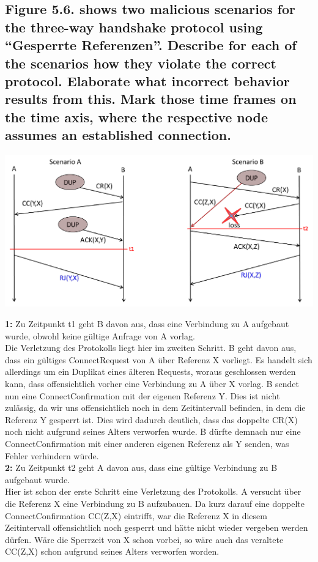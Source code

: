 \documentclass[a4paper,
			llpt,
			solution,
			accentcolor=tud2d,
			colorbacktitle
			]
			{tudexercise}
\begin{document}
\subsection{Figure 5.6. shows two malicious scenarios for the three-way handshake protocol using “Gesperrte Referenzen”. Describe for each of the scenarios how they violate the correct protocol. Elaborate what incorrect behavior results from this. Mark those time frames on the time axis, where the respective node assumes an established connection.}
\begin{center}
\includegraphics[scale=1.5]{5.png}
\end{center}
\textbf{1:} Zu Zeitpunkt t1 geht B davon aus, dass eine Verbindung zu A aufgebaut wurde, obwohl keine gültige Anfrage von A vorlag.\\
Die Verletzung des Protokolls liegt hier im zweiten Schritt. B geht davon aus, dass ein gültiges ConnectRequest von A über Referenz X vorliegt. Es handelt sich allerdings um ein Duplikat eines älteren Requests, woraus geschlossen werden kann, dass offensichtlich vorher eine Verbindung zu A über X vorlag. B sendet nun eine ConnectConfirmation mit der eigenen Referenz Y. Dies ist nicht zulässig, da wir uns offensichtlich noch in dem Zeitintervall befinden, in dem die Referenz Y gesperrt ist. Dies wird dadurch deutlich, dass das doppelte CR(X) noch nicht aufgrund seines Alters verworfen wurde. B dürfte demnach nur eine ConnectConfirmation mit einer anderen eigenen Referenz als Y senden, was Fehler verhindern würde.\\
\textbf{2:} Zu Zeitpunkt t2 geht A davon aus, dass eine gültige Verbindung zu B aufgebaut wurde.\\
Hier ist schon der erste Schritt eine Verletzung des Protokolls. A versucht über die Referenz X eine Verbindung zu B aufzubauen. Da kurz darauf eine doppelte ConnectConfirmation CC(Z,X) eintrifft, war die Referenz X in diesem Zeitintervall offensichtlich noch gesperrt und hätte nicht wieder vergeben werden dürfen. Wäre die Sperrzeit von X schon vorbei, so wäre auch das veraltete CC(Z,X) schon aufgrund seines Alters verworfen worden.
\end{document}
